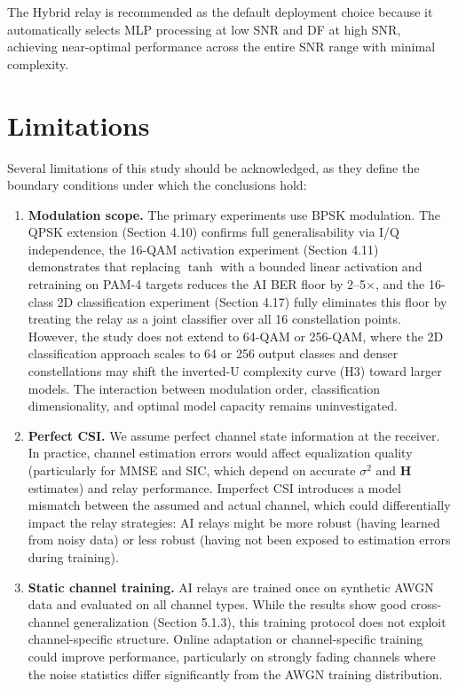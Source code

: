 The Hybrid relay is recommended as the default deployment choice because it automatically selects MLP processing at low SNR and DF at high SNR, achieving near-optimal performance across the entire SNR range with minimal complexity.

\section{Limitations}\label{sec:limitations}

Several limitations of this study should be acknowledged, as they define the boundary conditions under which the conclusions hold:

\begin{enumerate}
\def\labelenumi{\arabic{enumi}.}
\item
  \textbf{Modulation scope.} The primary experiments use BPSK modulation. The QPSK extension (Section 4.10) confirms full generalisability via I/Q independence, the 16-QAM activation experiment (Section 4.11) demonstrates that replacing \(\tanh\) with a bounded linear activation and retraining on PAM-4 targets reduces the AI BER floor by 2--5×, and the 16-class 2D classification experiment (Section 4.17) fully eliminates this floor by treating the relay as a joint classifier over all 16 constellation points. However, the study does not extend to 64-QAM or 256-QAM, where the 2D classification approach scales to 64 or 256 output classes and denser constellations may shift the inverted-U complexity curve (H3) toward larger models. The interaction between modulation order, classification dimensionality, and optimal model capacity remains uninvestigated.
\item
  \textbf{Perfect CSI.} We assume perfect channel state information at the receiver. In practice, channel estimation errors would affect equalization quality (particularly for MMSE and SIC, which depend on accurate \(\sigma^2\) and \(\mathbf{H}\) estimates) and relay performance. Imperfect CSI introduces a model mismatch between the assumed and actual channel, which could differentially impact the relay strategies: AI relays might be more robust (having learned from noisy data) or less robust (having not been exposed to estimation errors during training).
\item
  \textbf{Static channel training.} AI relays are trained once on synthetic AWGN data and evaluated on all channel types. While the results show good cross-channel generalization (Section 5.1.3), this training protocol does not exploit channel-specific structure. Online adaptation or channel-specific training could improve performance, particularly on strongly fading channels where the noise statistics differ significantly from the AWGN training distribution.

\end{enumerate}
